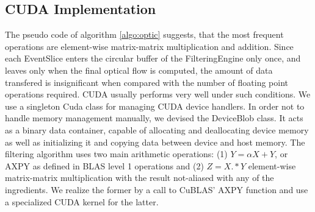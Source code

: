 \subsection{CUDA Implementation}

The pseudo code of algorithm \ref{algo:optic} suggests, that the most frequent operations are element-wise matrix-matrix multiplication and addition.
Since each EventSlice enters the circular buffer of the FilteringEngine only once, and leaves only when the final optical flow is computed, the amount of data transfered is insignificant when compared with the number of floating point operations required.
CUDA usually performs very well under such conditions.
We use a singleton Cuda class for managing CUDA device handlers.
In order not to handle memory management manually, we devised the DeviceBlob class. 
It acts as a binary data container, capable of allocating and deallocating device memory as well as initializing it and copying data between device and host memory. 
The filtering algorithm uses two main arithmetic operations: (1) $Y = \alpha X + Y$, or AXPY as defined in BLAS level 1 operations and (2) $Z = X .* Y$ element-wise matrix-matrix multiplication with the result not-aliased with any of the ingredients. We realize the former by a call to CuBLAS' AXPY function and use a specialized CUDA kernel for the latter.